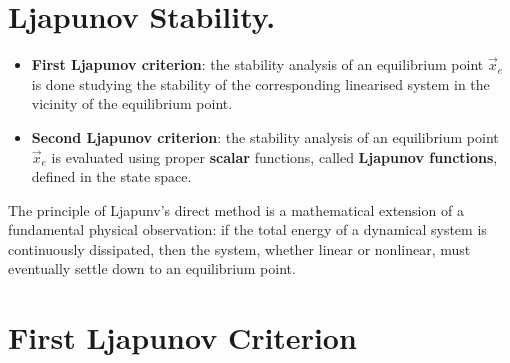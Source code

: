 \documentclass[12pt,a4paper,oneside]{book}
\begin{document}
\begin{onehalfspace}
\section{Ljapunov Stability.} 
\begin{itemize}
	\item[--] \textbf{First Ljapunov criterion}: the stability analysis of an equilibrium 
	point $\vec{x}_e$ is done studying the stability of the corresponding 
	linearised system in the vicinity of the equilibrium point.
	\item[--] \textbf{Second Ljapunov criterion}: the stability analysis of an equilibrium 
	point $\vec{x}_e$ is evaluated using proper \textbf{scalar} functions, called 
	\textbf{Ljapunov functions}, defined in the state space. 
\end{itemize}
The principle of 
Ljapunv's direct method is a mathematical extension of a fundamental physical 
observation: if the total energy of a dynamical system is continuously 
dissipated, then the system, whether linear or nonlinear, must eventually 
settle down to an equilibrium point. 

\section{First Ljapunov Criterion}

\end{onehalfspace}
\end{document}
